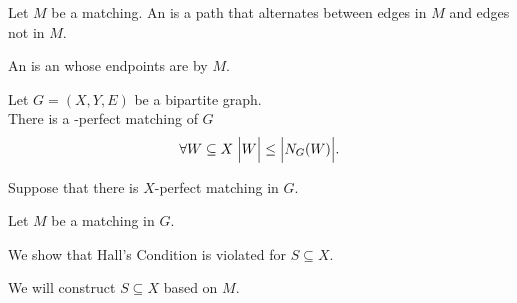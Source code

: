 \begin{frame}{}
  \begin{definition}
    Let $M$ be a matching.
    An  is a path that alternates
    between edges in $M$ and edges not in $M$.
  \end{definition}

  \vspace{0.80cm}

  \pause
  \vspace{0.60cm}
  \begin{definition}
    An  is an 
    whose endpoints are  by $M$.
  \end{definition}
\end{frame}

\begin{frame}{}
  \begin{theorem}
    Let $G = (X, Y, E)$ be a bipartite graph. \\[6pt]

    There is a -perfect matching of $G$ 
    \[
      \forall W \subseteq X\; \Big\lvert W \Big\rvert \le \Big\lvert N_{G}(W) \Big\rvert.
    \]
  \end{theorem}
\end{frame}

\begin{frame}{}
  \begin{center}

    \pause
    \vspace{0.30cm}
    Suppose that there is  $X$-perfect matching in $G$.

    \pause
    \vspace{0.30cm}
    Let $M$ be a  matching in $G$.

    \pause

    \pause
    \vspace{0.20cm}
    We show that Hall's Condition is violated for  $S \subseteq X$.

    \pause
    \vspace{0.50cm}
    We will construct $S \subseteq X$ based on $M$.
  \end{center}
\end{frame}

